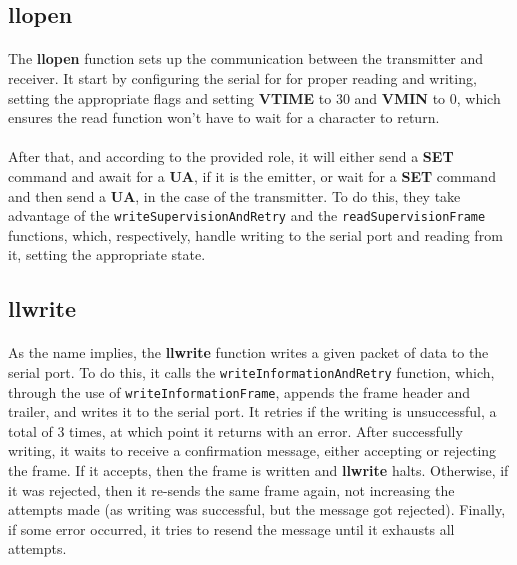 \documentclass[11pt]{article}
\begin{document}
\subsection*{llopen}

\paragraph{}The \textbf{llopen} function sets up the communication between the transmitter and receiver. It
start by configuring the serial for for proper reading and writing, setting the appropriate flags and
setting \textbf{VTIME} to 30 and \textbf{VMIN} to 0, which ensures the read function won't have to wait for
a character to return.

\paragraph{}After that, and according to the provided role, it will either send a \textbf{SET} command and
await for a \textbf{UA}, if it is the emitter, or wait for a \textbf{SET} command and then send a
\textbf{UA}, in the case of the transmitter. To do this, they take advantage of the
\verb|writeSupervisionAndRetry| and the \verb|readSupervisionFrame| functions, which, respectively, handle
writing to the serial port and reading from it, setting the appropriate state.

\subsection*{llwrite}

\paragraph{}As the name implies, the \textbf{llwrite} function writes a given packet of data to the serial
port. To do this, it calls the \verb|writeInformationAndRetry| function, which, through the use of
\verb|writeInformationFrame|, appends the frame header and trailer, and writes it to the serial port. It
retries if the writing is unsuccessful, a total of 3 times, at which point it returns with an error.
After successfully writing, it waits to receive a confirmation message, either accepting or rejecting the
frame. If it accepts, then the frame is written and \textbf{llwrite} halts. Otherwise, if it was rejected, then it
re-sends the same frame again, not increasing the attempts made (as writing was successful, but the message
got rejected). Finally, if some error occurred, it tries to resend the message until it exhausts all attempts.
\end{document}
